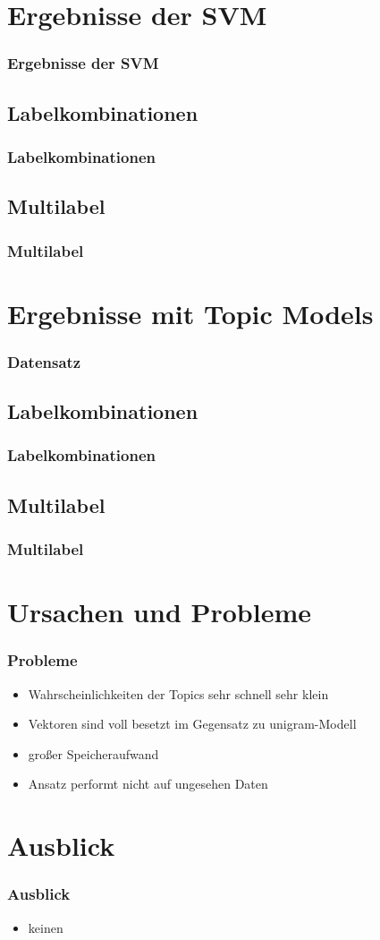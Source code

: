 \documentclass[12pt, xcolor=table]{beamer}
\begin{document}
\section{Ergebnisse der SVM}
\begin{frame}
    \frametitle{Ergebnisse der SVM}
\end{frame}
\subsection{Labelkombinationen} %
\begin{frame}
    \frametitle{Labelkombinationen}
\end{frame}

\subsection{Multilabel} %
\begin{frame}
    \frametitle{Multilabel}
\end{frame}

\section{Ergebnisse mit Topic Models}
\begin{frame}
    \frametitle{Datensatz}
\end{frame}
\subsection{Labelkombinationen} %
\begin{frame}
     \frametitle{Labelkombinationen}
\end{frame}

\subsection{Multilabel} %
\begin{frame}
     \frametitle{Multilabel}
\end{frame}

\section{Ursachen und Probleme}
\begin{frame}
    \frametitle{Probleme}
    \begin{itemize}
        \item Wahrscheinlichkeiten der Topics sehr schnell sehr klein
        \item Vektoren sind voll besetzt im Gegensatz zu unigram-Modell
        \item großer Speicheraufwand
        \item Ansatz performt nicht auf ungesehen Daten
    \end{itemize}
\end{frame}

\section{Ausblick} %
\begin{frame}
    \frametitle{Ausblick}
    \begin{itemize}
        \item keinen
    \end{itemize}
\end{frame}
\end{document}
